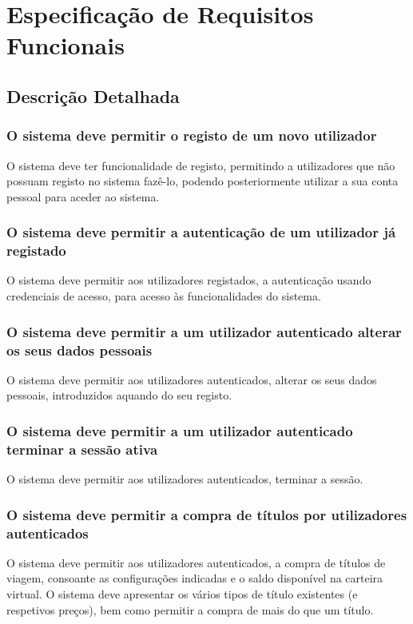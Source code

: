 \chapter{Especificação de Requisitos Funcionais} \label{rer}

\section{Descrição Detalhada}

\subsection{O sistema deve permitir o registo de um novo utilizador}
O sistema deve ter funcionalidade de registo, permitindo a utilizadores que não possuam registo no sistema fazê-lo, podendo posteriormente utilizar a sua conta pessoal para aceder ao sistema.

\subsection{O sistema deve permitir a autenticação de um utilizador já registado}
O sistema deve permitir aos utilizadores registados, a autenticação usando credenciais de acesso, para acesso às funcionalidades do sistema.

\subsection{O sistema deve permitir a um utilizador autenticado alterar os seus dados pessoais}
O sistema deve permitir aos utilizadores autenticados, alterar os seus dados pessoais, introduzidos aquando do seu registo.

\subsection{O sistema deve permitir a um utilizador autenticado terminar a sessão ativa}
O sistema deve permitir aos utilizadores autenticados, terminar a sessão.

\subsection{O sistema deve permitir a compra de títulos por utilizadores autenticados}
O sistema deve permitir aos utilizadores autenticados, a compra de títulos de viagem, consoante as configurações indicadas e o saldo disponível na carteira virtual. O sistema deve apresentar os vários tipos de título existentes (e respetivos preços), bem como permitir a compra de mais do que um título.

